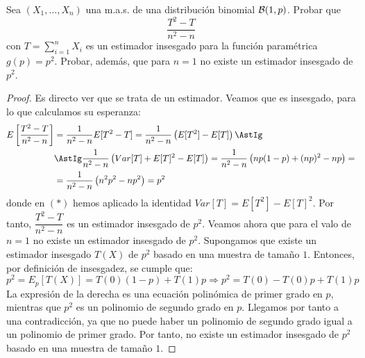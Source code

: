 \begin{ejemplo}
    Sea $(X_1, \ldots, X_n)$ una m.a.s. de una distribución binomial $\mathcal{B}(1, p)$. Probar que
    \begin{equation*}
        \dfrac{T^2 - T}{n^2 - n}
    \end{equation*}
    con $T = \sum\limits_{i=1}^{n} X_i$ es un estimador insesgado para la función paramétrica $g(p) = p^2$. Probar, además, que para $n = 1$ no existe un estimador insesgado de $p^2$.
    \begin{proof}
        Es directo ver que se trata de un estimador. Veamos que es insesgado, para lo que calculamos su esperanza:
        \begin{align*}
            E\left[\dfrac{T^2 - T}{n^2 - n}\right]
            &= \dfrac{1}{n^2 - n} E[T^2 - T]
            = \dfrac{1}{n^2 - n} \left(E[T^2] - E[T]\right)
            \AstIg\\&\AstIg \dfrac{1}{n^2 - n} \left(Var[T] + E[T]^2 - E[T]\right) = \dfrac{1}{n^2 - n} \left(np(1-p) + (np)^2 - np\right) =\\&= \dfrac{1}{n^2 - n} \left(n^2p^2 - np^2\right) = p^2
        \end{align*}
        donde en $(\ast)$ hemos aplicado la identidad $Var[T] = E[T^2] - E[T]^2$. Por tanto, $\dfrac{T^2 - T}{n^2 - n}$ es un estimador insesgado de $p^2$. Veamos ahora que para el valo de $n = 1$ no existe un estimador insesgado de $p^2$. Supongamos que existe un estimador insesgado $T(X)$ de $p^2$ basado en una muestra de tamaño $1$. Entonces, por definición de insesgadez, se cumple que:
        \begin{equation*}
            p^2 = E_p[T(X)] = T(0)(1-p) + T(1)p \Longrightarrow p^2 = T(0) - T(0)p + T(1)p
        \end{equation*}
        La expresión de la derecha es una ecuación polinómica de primer grado en $p$, mientras que $p^2$ es un polinomio de segundo grado en $p$. Llegamos por tanto a una contradicción, ya que no puede haber un polinomio de segundo grado igual a un polinomio de primer grado. Por tanto, no existe un estimador insesgado de $p^2$ basado en una muestra de tamaño $1$.
    \end{proof}
\end{ejemplo}

